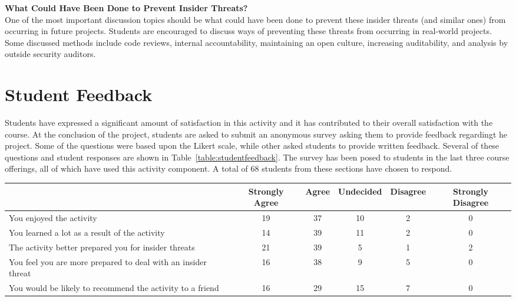 \documentclass[conference]{IEEEtran}
\begin{document}
\textbf{What Could Have Been Done to Prevent Insider Threats?}\\
One of the most important discussion topics should be what could have been done to prevent these insider threats (and similar ones) from occurring in future projects. Students are encouraged to discuss ways of preventing these threats from occurring in real-world projects. Some discussed methods include code reviews, internal accountability, maintaining an open culture, increasing auditability, and analysis by outside security auditors. \\


\section{Student Feedback}
\label{sec: studentfeedback}


Students have expressed a significant amount of satisfaction in this activity and it has contributed to their overall satisfaction with the course. At the conclusion of the project, students are asked to submit an anonymous survey asking them to provide feedback regardingt he project. Some of the questions were based upon the Likert scale, while other asked students to provide written feedback. Several of these questions and student responses are shown in Table~\ref{table:studentfeedback}. The survey has been posed to students in the last three course offerings, all of which have used this activity component. A total of 68 students from these sections have chosen to respond.

\begin{table*}[t]
\caption{Student Responses}
\centering
    \begin{tabular}{ l | c | c | c | c | c     }

	\bfseries  & \bfseries Strongly Agree & \bfseries Agree & \bfseries Undecided & \bfseries Disagree  & \bfseries Strongly Disagree \\ \hline \hline

	 You enjoyed the activity & 19 & 37 & 10 & 2  & 0 \\ \hline
	 You learned a lot as a result of the activity & 14 & 39 & 11 & 2  & 0 \\ \hline
	 The activity better prepared you for insider threats  & 21 & 39 & 5 & 1 & 2 \\ \hline
	 You feel you are more prepared to deal with an insider threat & 16 & 38 & 9 & 5  & 0 \\ \hline
	 You would be likely to recommend the activity to a friend & 16 & 29 & 15 & 7 & 0 \\

    \end{tabular}

\label{table:studentfeedback}
\end{table*}
\end{document}
